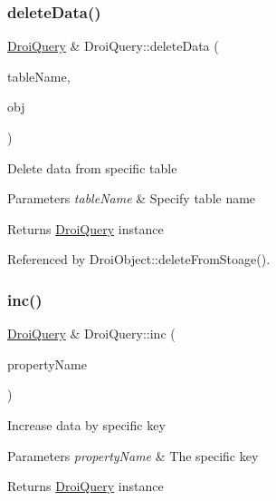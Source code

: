 \subsubsection{\texorpdfstring{delete\+Data()}{deleteData()}}
{\footnotesize\ttfamily \hyperlink{class_droi_query}{Droi\+Query} \& Droi\+Query\+::delete\+Data (\begin{DoxyParamCaption}\item[{const std\+::string \&}]{table\+Name,  }\item[{\hyperlink{class_droi_object}{Droi\+Object} \&}]{obj }\end{DoxyParamCaption})}

Delete data from specific table 
\begin{DoxyParams}{Parameters}
{\em table\+Name} & Specify table name \\
\hline
\end{DoxyParams}
\begin{DoxyReturn}{Returns}
\hyperlink{class_droi_query}{Droi\+Query} instance 
\end{DoxyReturn}


Referenced by Droi\+Object\+::delete\+From\+Stoage().

\mbox{\label{class_droi_query_a7a00f94da8d005eeb702cdb1dbabb452}} 
\subsubsection{\texorpdfstring{inc()}{inc()}}
{\footnotesize\ttfamily \hyperlink{class_droi_query}{Droi\+Query} \& Droi\+Query\+::inc (\begin{DoxyParamCaption}\item[{const std\+::string \&}]{property\+Name }\end{DoxyParamCaption})}

Increase data by specific key 
\begin{DoxyParams}{Parameters}
{\em property\+Name} & The specific key \\
\hline
\end{DoxyParams}
\begin{DoxyReturn}{Returns}
\hyperlink{class_droi_query}{Droi\+Query} instance 
\end{DoxyReturn}
\mbox{\label{class_droi_query_aaaad33d51fe1b6d137fc18dd04c59df0}} 
